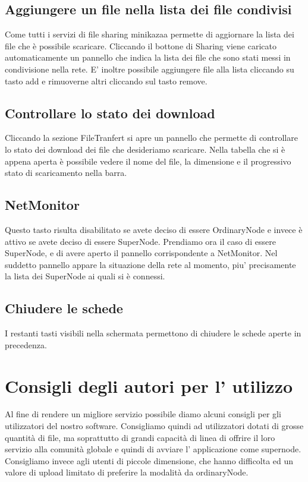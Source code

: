 	\subsection{Aggiungere un file nella lista dei file condivisi}
Come tutti i servizi di file sharing minikazaa permette di aggiornare la lista dei file che è possibile scaricare.
Cliccando il bottone di Sharing viene caricato automaticamente un pannello che indica la lista dei file che sono stati messi in condivisione nella rete.
E' inoltre possibile aggiungere file alla lista cliccando su tasto add e rimuoverne altri cliccando sul tasto remove.

	\subsection{Controllare lo stato dei download}
Cliccando la sezione FileTranfert si apre un pannello che permette di controllare lo stato dei download dei file che desideriamo scaricare.
Nella tabella che si è appena aperta è possibile vedere il nome del file, la dimensione e il progressivo stato di scaricamento nella barra.

	\subsection{NetMonitor}
Questo tasto risulta disabilitato se avete deciso di essere OrdinaryNode e invece è attivo se avete deciso di essere SuperNode.
Prendiamo ora il caso di essere SuperNode, e di avere aperto il pannello corrispondente a NetMonitor.
Nel suddetto pannello appare la situazione della rete al momento, piu' precisamente la lista dei SuperNode ai quali si è connessi.


	\subsection{Chiudere le schede}
I restanti tasti visibili nella schermata permettono di chiudere le schede aperte in precedenza.

	\section{Consigli degli autori per l' utilizzo}
Al fine di rendere un migliore servizio possibile diamo alcuni consigli per gli utilizzatori del nostro software.
Consigliamo quindi ad utilizzatori dotati di grosse quantità di file, ma soprattutto di grandi capacità di linea di offrire il loro servizio alla comunità globale e quindi di avviare l' applicazione come supernode.
Consigliamo invece agli utenti di piccole dimensione, che hanno difficolta ed un valore di upload limitato di preferire la modalità da ordinaryNode.
  
